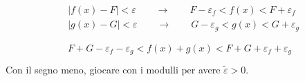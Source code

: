 \documentclass[letterpaper,10pt,italian]{jupyterBook}
\begin{document}
\begin{equation*}
\begin{split}\begin{aligned}
  & |f(x) - F| < \varepsilon \qquad \rightarrow \qquad F - \varepsilon_f < f(x) < F + \varepsilon_f \\
  & |g(x) - G| < \varepsilon \qquad \rightarrow \qquad G - \varepsilon_g < g(x) < G + \varepsilon_g \\
\end{aligned}\end{split}
\end{equation*}\begin{equation*}
\begin{split}\begin{aligned}
   F + G - \varepsilon_f - \varepsilon_g < f(x) + g(x)  < F + G + \varepsilon_f + \varepsilon_g \\
\end{aligned}\end{split}
\end{equation*}
\sphinxAtStartPar
Con il segno meno, giocare con i modulli per avere \(\tilde{\varepsilon} > 0\).
\end{document}
